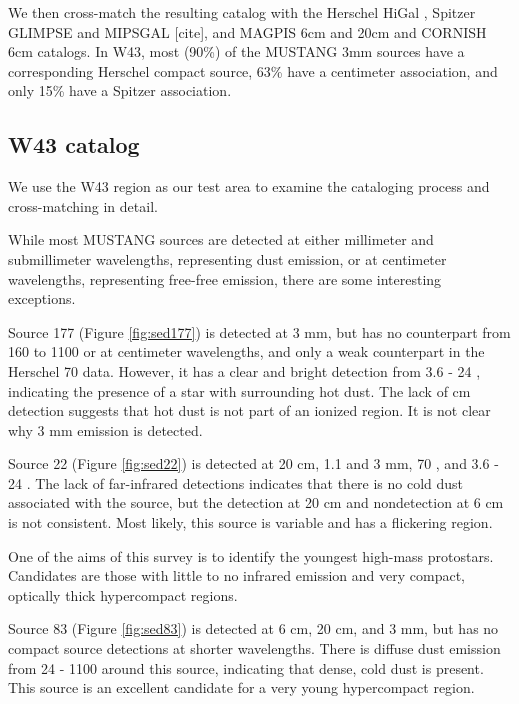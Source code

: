 \documentclass[twocolumn]{aastex62}
\begin{document}
We then cross-match the resulting catalog with the Herschel HiGal
\citep{Elia2017a}, Spitzer GLIMPSE and MIPSGAL [cite], and MAGPIS 6cm and 20cm
\citep{Giveon2005a,Hoare2006a} and CORNISH 6cm \citep{Hoare2012a} catalogs.  In
W43, most (90\%) of the MUSTANG 3mm sources have a corresponding Herschel
compact source, 63\% have a centimeter association, and only 15\% have a
Spitzer association.

\subsection{W43 catalog}
We use the W43 region as our test area to examine the cataloging process and
cross-matching in detail.

While most MUSTANG sources are detected at either millimeter and submillimeter
wavelengths, representing dust emission, or at centimeter wavelengths,
representing free-free emission, there are some interesting exceptions.

Source 177 (Figure \ref{fig:sed177}) is detected at 3 mm, but has no counterpart from 160 to 1100 \um or
at centimeter wavelengths, and only a weak counterpart in the Herschel 70 \um
data. However, it has a clear and bright detection from 3.6 - 24 \um, indicating
the presence of a star with surrounding hot dust.  The lack of cm detection suggests
that hot dust is not part of an ionized region.  It is not clear why 3 mm emission
is detected.

Source 22 (Figure \ref{fig:sed22}) is detected at 20 cm, 1.1 and 3 mm, 70 \um, and 3.6 - 24 \um.  The lack
of far-infrared detections indicates that there is no cold dust associated with
the source, but the detection at 20 cm and nondetection at 6 cm is not consistent.
Most likely, this source is variable and has a flickering \hii region.

One of the aims of this survey is to identify the youngest high-mass protostars.
Candidates are those with little to no infrared emission and very compact, optically
thick hypercompact \hii regions.

Source 83 (Figure \ref{fig:sed83}) is detected at 6 cm, 20 cm, and 3 mm, but has no compact source detections
at shorter wavelengths.  There is diffuse dust emission from 24 - 1100 \um around this
source, indicating that dense, cold dust is present.  This source is an excellent
candidate for a very young hypercompact \hii region.
\end{document}
